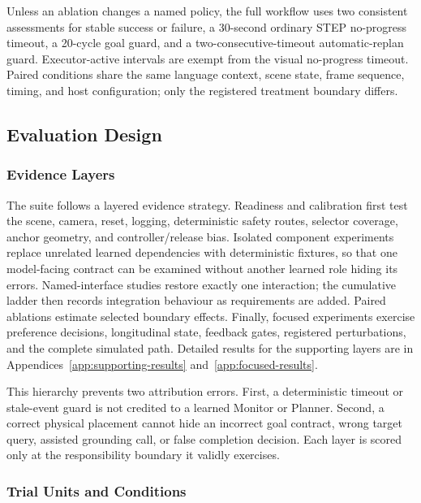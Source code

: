 \documentclass{article}
\begin{document}
Unless an ablation changes a named policy, the full workflow uses two
consistent assessments for stable success or failure, a 30-second ordinary
STEP no-progress timeout, a 20-cycle goal guard, and a two-consecutive-timeout
automatic-replan guard. Executor-active intervals are exempt from the visual
no-progress timeout. Paired conditions share the same language context, scene
state, frame sequence, timing, and host configuration; only the registered
treatment boundary differs.

\subsection{Evaluation Design}
\label{subsec:evaluation-design}

\subsubsection{Evidence Layers}

The suite follows a layered evidence strategy. Readiness and calibration first
test the scene, camera, reset, logging, deterministic safety routes, selector
coverage, anchor geometry, and controller/release bias. Isolated component
experiments replace unrelated learned dependencies with deterministic fixtures,
so that one model-facing contract can be examined without another learned role
hiding its errors. Named-interface studies restore exactly one interaction;
the cumulative ladder then records integration behaviour as requirements are
added. Paired ablations estimate selected boundary effects. Finally, focused
experiments exercise preference decisions, longitudinal state, feedback gates,
registered perturbations, and the complete simulated path. Detailed results for
the supporting layers are in Appendices~\ref{app:supporting-results}
and~\ref{app:focused-results}.

This hierarchy prevents two attribution errors. First, a deterministic timeout
or stale-event guard is not credited to a learned Monitor or Planner. Second, a
correct physical placement cannot hide an incorrect goal contract, wrong target
query, assisted grounding call, or false completion decision. Each layer is
scored only at the responsibility boundary it validly exercises.

\subsubsection{Trial Units and Conditions}
\end{document}

